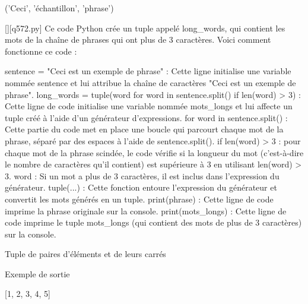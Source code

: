 ('Ceci', 'échantillon', 'phrase')
        \par
        \begin{solution}
            \renewcommand{\nomfichier}{q572.py}
            \pythonfile{\chemincode \nomfichier}[][\nomfichier]
            Ce code Python crée un tuple appelé long_words, qui contient les mots de la chaîne de phrases qui ont plus de 3 caractères. Voici comment fonctionne ce code :

    sentence = "Ceci est un exemple de phrase" : Cette ligne initialise une variable nommée sentence et lui attribue la chaîne de caractères "Ceci est un exemple de phrase".
    long_words = tuple(word for word in sentence.split() if len(word) > 3) : Cette ligne de code initialise une variable nommée mots_longs et lui affecte un tuple créé à l'aide d'un générateur d'expressions.
        for word in sentence.split() : Cette partie du code met en place une boucle qui parcourt chaque mot de la phrase, séparé par des espaces à l'aide de sentence.split().
        if len(word) > 3 : pour chaque mot de la phrase scindée, le code vérifie si la longueur du mot (c'est-à-dire le nombre de caractères qu'il contient) est supérieure à 3 en utilisant len(word) > 3.
        word : Si un mot a plus de 3 caractères, il est inclus dans l'expression du générateur.
        tuple(...) : Cette fonction entoure l'expression du générateur et convertit les mots générés en un tuple.
    print(phrase) : Cette ligne de code imprime la phrase originale sur la console.
    print(mots_longs) : Cette ligne de code imprime le tuple mots_longs (qui contient des mots de plus de 3 caractères) sur la console.
        \end{solution}
        

        \question
        Tuple de paires d'éléments et de leurs carrés

Exemple de sortie

[1, 2, 3, 4, 5]

